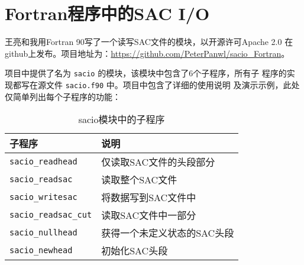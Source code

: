 \section{Fortran程序中的SAC I/O}
王亮和我用Fortran 90写了一个读写SAC文件的模块，以开源许可Apache 2.0
在github上发布。项目地址为：\url{https://github.com/PeterPanwl/sacio_Fortran}。

项目中提供了名为 \texttt{sacio} 的模块，该模块中包含了6个子程序，所有子
程序的实现都写在源文件 \texttt{sacio.f90} 中。项目中包含了详细的使用说明
及演示示例，此处仅简单列出每个子程序的功能：

\begin{table}[H]
\centering
\caption{sacio模块中的子程序}
\label{table:sacio_Fortran}
\begin{tabular}{ll}
\toprule
子程序      &   说明        \\
\midrule
\verb|sacio_readhead|      &   仅读取SAC文件的头段部分 \\
\verb|sacio_readsac|       &   读取整个SAC文件 \\
\verb|sacio_writesac|      &   将数据写到SAC文件中 \\
\verb|sacio_readsac_cut|   &   读取SAC文件中一部分 \\
\verb|sacio_nullhead|      &   获得一个未定义状态的SAC头段\\
\verb|sacio_newhead|       &   初始化SAC头段\\
\bottomrule
\end{tabular}
\end{table}
